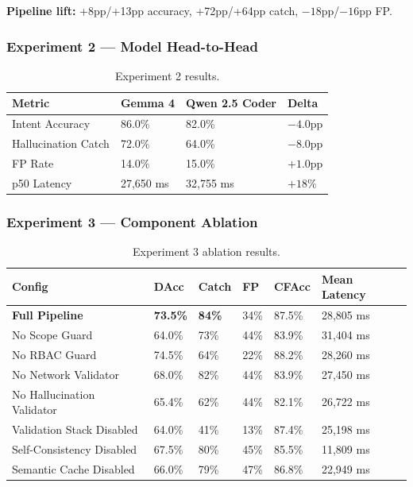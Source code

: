 \documentclass[10pt,journal,onecolumn]{IEEEtran}
\begin{document}
\noindent\textbf{Pipeline lift:} +8pp/+13pp accuracy, +72pp/+64pp catch, $-18$pp/$-16$pp FP.

\subsubsection{Experiment 2 --- Model Head-to-Head}
\begin{table}[h]
\caption{Experiment 2 results.}
\label{tab:exp2}
\begin{tabularx}{\columnwidth}{l X X X}
\toprule
\textbf{Metric} & \textbf{Gemma 4} & \textbf{Qwen 2.5 Coder} & \textbf{Delta}\\
\midrule
Intent Accuracy & 86.0\% & 82.0\% & $-4.0$pp\\
Hallucination Catch & 72.0\% & 64.0\% & $-8.0$pp\\
FP Rate & 14.0\% & 15.0\% & $+1.0$pp\\
p50 Latency & 27,650 ms & 32,755 ms & $+18\%$\\
\bottomrule
\end{tabularx}
\end{table}

\subsubsection{Experiment 3 --- Component Ablation}
\begin{table}[t]
\caption{Experiment 3 ablation results.}
\label{tab:exp3}
\begin{tabularx}{\textwidth}{l X X X X X}
\toprule
\textbf{Config} & \textbf{DAcc} & \textbf{Catch} & \textbf{FP} & \textbf{CFAcc} & \textbf{Mean Latency}\\
\midrule
\textbf{Full Pipeline} & \textbf{73.5\%} & \textbf{84\%} & 34\% & 87.5\% & 28,805 ms\\
No Scope Guard & 64.0\% & 73\% & 44\% & 83.9\% & 31,404 ms\\
No RBAC Guard & 74.5\% & 64\% & 22\% & 88.2\% & 28,260 ms\\
No Network Validator & 68.0\% & 82\% & 44\% & 83.9\% & 27,450 ms\\
No Hallucination Validator & 65.4\% & 62\% & 44\% & 82.1\% & 26,722 ms\\
Validation Stack Disabled & 64.0\% & 41\% & 13\% & 87.4\% & 25,198 ms\\
Self-Consistency Disabled & 67.5\% & 80\% & 45\% & 85.5\% & 11,809 ms\\
Semantic Cache Disabled & 66.0\% & 79\% & 47\% & 86.8\% & 22,949 ms\\
\bottomrule
\end{tabularx}
\end{table}
\end{document}
